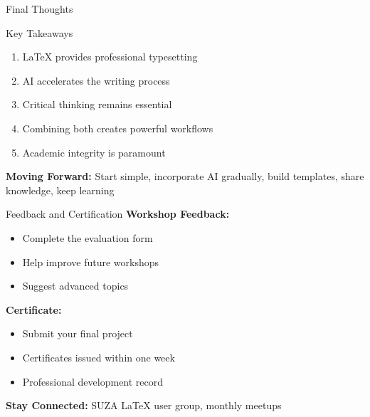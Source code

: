 \documentclass[aspectratio=169]{beamer}
\begin{document}
	\begin{frame}{Final Thoughts}
		\begin{block}{Key Takeaways}
			\begin{enumerate}
				\item LaTeX provides professional typesetting
				\item AI accelerates the writing process
				\item Critical thinking remains essential
				\item Combining both creates powerful workflows
				\item Academic integrity is paramount
			\end{enumerate}
		\end{block}
		
		\vspace{0.5em}
		
		\textbf{Moving Forward:} Start simple, incorporate AI gradually, build templates, share knowledge, keep learning
	\end{frame}
	
	\begin{frame}{Feedback and Certification}
		\textbf{Workshop Feedback:}
		\begin{itemize}
			\item Complete the evaluation form
			\item Help improve future workshops
			\item Suggest advanced topics
		\end{itemize}
		
		\vspace{0.5em}
		
		\textbf{Certificate:}
		\begin{itemize}
			\item Submit your final project
			\item Certificates issued within one week
			\item Professional development record
		\end{itemize}
		
		\vspace{0.5em}
		
		\textbf{Stay Connected:} SUZA LaTeX user group, monthly meetups
	\end{frame}
	
\end{document}
